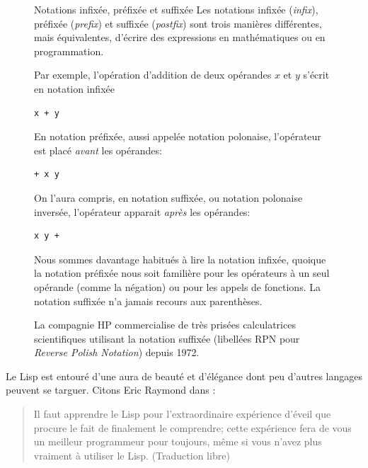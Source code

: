 \begin{figure}[t]
  \setlength{\FrameRule}{1pt}
  \begin{emphbox}{\mdseries Notations infixée, préfixée et suffixée}
    Les notations infixée (\emph{infix}), préfixée (\emph{prefix}) et
    suffixée (\emph{postfix}) sont trois manières différentes, mais
    équivalentes, d'écrire des expressions en mathématiques ou en
    programmation.

    Par exemple, l'opération d'addition de deux opérandes $x$ et $y$
    s'écrit en notation infixée
\begin{lstlisting}[backgroundcolor=\color{codebg}]
x + y
\end{lstlisting}
    En notation préfixée, aussi appelée notation polonaise,
    l'opérateur est placé \emph{avant} les opérandes:
\begin{lstlisting}[backgroundcolor=\color{codebg}]
+ x y
\end{lstlisting}
    On l'aura compris, en notation suffixée, ou notation polonaise
    inversée, l'opérateur apparait \emph{après} les opérandes:
\begin{lstlisting}[backgroundcolor=\color{codebg}]
x y +
\end{lstlisting}
    Nous sommes davantage habitués à lire la notation infixée, quoique
    la notation préfixée nous soit familière pour les opérateurs à un
    seul opérande (comme la négation) ou pour les appels de fonctions.
    La notation suffixée n'a jamais recours aux parenthèses.

    La compagnie HP commercialise de très prisées calculatrices
    scientifiques utilisant la notation suffixée (libellées RPN pour
    \emph{Reverse Polish Notation}) depuis 1972.
  \end{emphbox}
\end{figure}

Le Lisp est entouré d'une aura de beauté et d'élégance dont peu
d'autres langages peuvent se targuer. Citons Eric Raymond
dans
:
\begin{quote}
  Il faut apprendre le Lisp pour l'extraordinaire expérience d'éveil
  que procure le fait de finalement le comprendre; cette expérience
  fera de vous un meilleur programmeur pour toujours, même si vous
  n'avez plus vraiment à utiliser le Lisp. (Traduction libre)
\end{quote}

